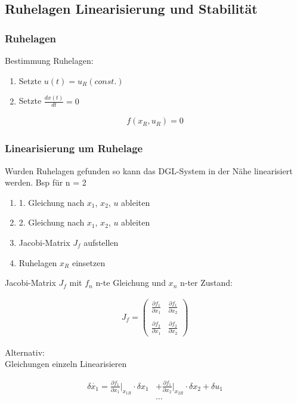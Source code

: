\documentclass[10pt,a4paper]{article}
\begin{document}
\subsection{Ruhelagen Linearisierung und Stabilität}

\subsubsection{Ruhelagen}
Bestimmung Ruhelagen:
\begin{enumerate}
    \item Setzte $u(t) = u_R (const.)$
    \item Setzte $\frac{dx(t)}{dt} = 0$
\end{enumerate}

  \begin{mdframed}[style=exercise]
    \begin{align}
        f(x_R, u_R) = 0
    \end{align}
  \end{mdframed}

\subsubsection{Linearisierung um Ruhelage}
Wurden Ruhelagen gefunden so kann das DGL-System in der
Nähe linearisiert werden.
Bsp für n = 2
\begin{enumerate}
    \item 1. Gleichung nach $x_1$, $x_2$, $u$ ableiten
    \item 2. Gleichung nach $x_1$, $x_2$, $u$ ableiten
    \item Jacobi-Matrix $J_f$ aufstellen 
    \item Ruhelagen $x_R$ einsetzen
\end{enumerate}
Jacobi-Matrix $J_f$ mit $f_n$ n-te Gleichung und $x_n$ n-ter Zustand:
  \begin{mdframed}[style=exercise]
    \begin{align}
        J_f = 
        \begin{pmatrix}
            \frac{\partial f_1}{\partial x_1} & \frac{\partial f_1}{\partial x_2} \\ \\
            \frac{\partial f_2}{\partial x_1} & \frac{\partial f_2}{\partial x_2} 
        \end{pmatrix} 
    \end{align}
  \end{mdframed}
Alternativ: \\
Gleichungen einzeln Linearisieren
  \begin{mdframed}[style=exercise]
    \begin{align}
        \delta \dot{x_1} = \frac{\partial f_1}{\partial x_1} \big|_{x_{1R}} \cdot \delta x_1
        &+ \frac{\partial f_1}{\partial x_2} \big|_{x_{2R}} \cdot \delta x_2+ \delta u_1 \\
        &...
    \end{align}
  \end{mdframed}
\end{document}
